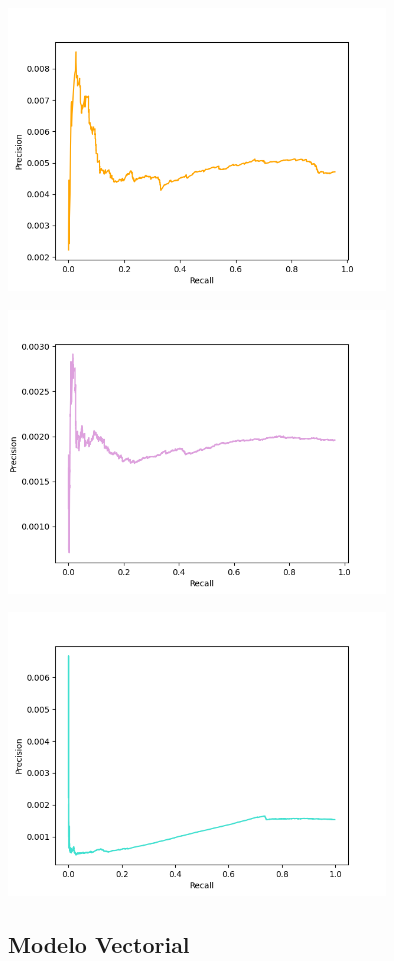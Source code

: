 \documentclass{llncs}
\begin{document}
	\begin{center}
		\includegraphics[width=10cm]{cranfield_boolean}
		
		\includegraphics[width=10cm]{vaswani_boolean}
		
		\includegraphics[width=10cm]{cord19_boolean}
	\end{center}
	
	\subsection{Modelo Vectorial}
\end{document}
